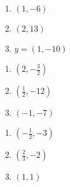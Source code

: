 \begin{multicols}{3}
\begin{enumerate}
\setcounter{enumi}{\value{HW}}

\item $(1,-6)$
\item $(2,13)$
\item $y = (1,-10)$

\setcounter{HW}{\value{enumi}}
\end{enumerate}
\end{multicols}

\begin{multicols}{3}
\begin{enumerate}
\setcounter{enumi}{\value{HW}}

\item $\left(2, -\frac{3}{2}\right)$
\item $\left(\frac{1}{2}, -12 \right)$
\item $(-1,-7)$

\setcounter{HW}{\value{enumi}}
\end{enumerate}
\end{multicols}

\begin{multicols}{3}
\begin{enumerate}
\setcounter{enumi}{\value{HW}}

\item $\left(-\frac{1}{2}, -3\right)$
\item $\left(\frac{2}{3}, -2 \right)$
\item $(1,1)$

\setcounter{HW}{\value{enumi}}
\end{enumerate}
\end{multicols}


